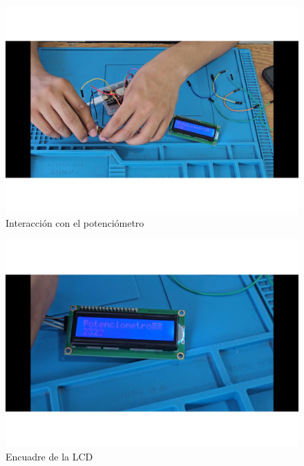     
    \begin{figure}[H]
        \centering
        \includegraphics[trim = {25mm 25mm 25mm 10mm},clip,scale=0.3]{22/Img/e15.pdf}
        \caption{Interacción con el potenciómetro}
        \label{fig:evi6}
    \end{figure}
    
    
    \begin{figure}[H]
        \centering
        \includegraphics[trim =  {25mm 25mm 25mm 10mm},clip,scale=0.3]{22/Img/e17.pdf}
        \caption{Encuadre de la LCD}
        \label{fig:evi7}
    \end{figure}
    
